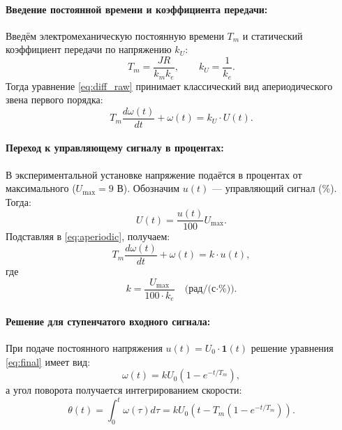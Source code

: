 \documentclass[a4paper, 12pt]{article}
\begin{document}
\paragraph{Введение постоянной времени и коэффициента передачи:}
Введём электромеханическую постоянную времени $T_m$ и статический коэффициент передачи по напряжению $k_U$:
\begin{equation}
T_m = \frac{JR}{k_m k_e}, \qquad k_U = \frac{1}{k_e}.
\end{equation}
Тогда уравнение \eqref{eq:diff_raw} принимает классический вид апериодического звена первого порядка:
\begin{equation}
T_m \frac{d\omega(t)}{dt} + \omega(t) = k_U \cdot U(t).
\label{eq:aperiodic}
\end{equation}

\paragraph{Переход к управляющему сигналу в процентах:}
В экспериментальной установке напряжение подаётся в процентах от максимального ($U_{\text{max}} = 9$ В). Обозначим $u(t)$ — управляющий сигнал (\%). Тогда:
\begin{equation}
U(t) = \frac{u(t)}{100} U_{\text{max}}.
\end{equation}
Подставляя в \eqref{eq:aperiodic}, получаем:
\begin{equation}
T_m \frac{d\omega(t)}{dt} + \omega(t) = k \cdot u(t),
\label{eq:final}
\end{equation}
где
\begin{equation}
k = \frac{U_{\text{max}}}{100 \cdot k_e} \quad \text{(рад/(с·\%))}.
\end{equation}

\paragraph{Решение для ступенчатого входного сигнала:}
При подаче постоянного напряжения $u(t) = U_0 \cdot \mathbf{1}(t)$ решение уравнения \eqref{eq:final} имеет вид:
\begin{equation}
\omega(t) = k U_0 \left(1 - e^{-t/T_m}\right),
\label{eq:omega_solution}
\end{equation}
а угол поворота получается интегрированием скорости:
\begin{equation}
\theta(t) = \int_0^t \omega(\tau) d\tau = k U_0 \left( t - T_m \left(1 - e^{-t/T_m}\right) \right).
\label{eq:theta_solution}
\end{equation}
\end{document}
